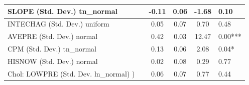 \begin{table}
\begin{center}
\begin{tabular}{|l|l|c|c|c|l|}
			\hline
			SLOPE (Std. Dev.) tn_normal &  & -0.11 & 0.06 & -1.68 & 0.10 \\
			\hline
			INTECHAG (Std. Dev.) uniform &  & 0.05 & 0.07 & 0.70 & 0.48 \\
			\hline
			AVEPRE (Std. Dev.) normal &  & 0.42 & 0.03 & 12.47 & 0.00*** \\
			\hline
			CPM (Std. Dev.) tn_normal &  & 0.13 & 0.06 & 2.08 & 0.04* \\
			\hline
			HISNOW (Std. Dev.) normal &  & 0.02 & 0.08 & 0.29 & 0.77 \\
			\hline
			 Chol: LOWPRE (Std. Dev. ln_normal) ) &  & 0.06 & 0.07 & 0.77 & 0.44 \\
			\hline
		\end{tabular}
	\end{center}
\end{table}